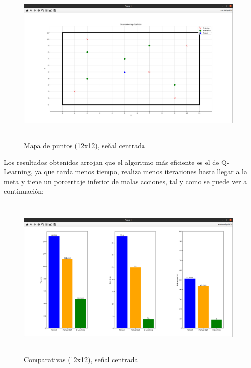 \begin{figure} [H]
    \begin{center}
    \includegraphics[height=8cm]{imagenes/cap4/17_mapa_p_centro_12.png}
    \end{center}
    \caption[Mapa de puntos (12x12), señal centrada]{Mapa de puntos (12x12), señal centrada}
    \label{fig:map_p_center_12}
\end{figure}

Los resultados obtenidos arrojan que el algoritmo más eficiente es el de Q-Learning, ya que tarda menos tiempo, realiza menos iteraciones hasta llegar a la meta y tiene un porcentaje inferior de malas acciones, tal y como se puede ver a continuación:\\

\begin{figure} [H]
    \begin{center}
    \includegraphics[height=8cm]{imagenes/cap4/18_comp_centro_12.png}
    \end{center}
    \caption[Comparativas (12x12), señal centrada]{Comparativas (12x12), señal centrada}
    \label{fig:comp_center_12}
\end{figure}

